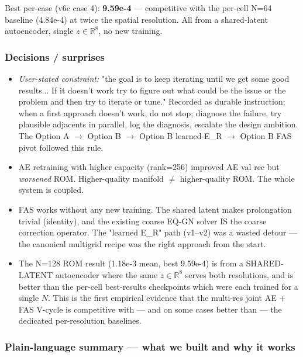 Best per-case (v6c case 4): \textbf{9.59e-4} --- competitive with the
per-cell N=64 baseline (4.84e-4) at twice the spatial resolution. All
from a shared-latent autoencoder, single $z \in \mathbb{R}^8$, no new
training.

\subsubsection*{Decisions / surprises}
\begin{itemize}
  \item \emph{User-stated constraint:} "the goal is to keep iterating
        until we get some good results... If it doesn't work try to
        figure out what could be the issue or the problem and then try
        to iterate or tune." Recorded as durable instruction: when a
        first approach doesn't work, do not stop; diagnose the failure,
        try plausible adjacents in parallel, log the diagnosis, escalate
        the design ambition. The Option A $\to$ Option B $\to$ Option B
        learned-E\_R $\to$ Option B FAS pivot followed this rule.
  \item AE retraining with higher capacity (rank=256) improved
        AE val rec but \emph{worsened} ROM. Higher-quality manifold $\ne$
        higher-quality ROM. The whole system is coupled.
  \item FAS works without any new training. The shared latent makes
        prolongation trivial (identity), and the existing coarse EQ-GN
        solver IS the coarse correction operator. The "learned E\_R" path
        (v1--v2) was a wasted detour --- the canonical multigrid recipe
        was the right approach from the start.
  \item The N=128 ROM result (1.18e-3 mean, best 9.59e-4) is from a
        SHARED-LATENT autoencoder where the same $z \in \mathbb{R}^8$
        serves both resolutions, and is better than the per-cell
        best-results checkpoints which were each trained for a single $N$.
        This is the first empirical evidence that the multi-res joint
        AE + FAS V-cycle is competitive with --- and on some cases
        better than --- the dedicated per-resolution baselines.
\end{itemize}



\subsubsection*{Plain-language summary --- what we built and why it works}

